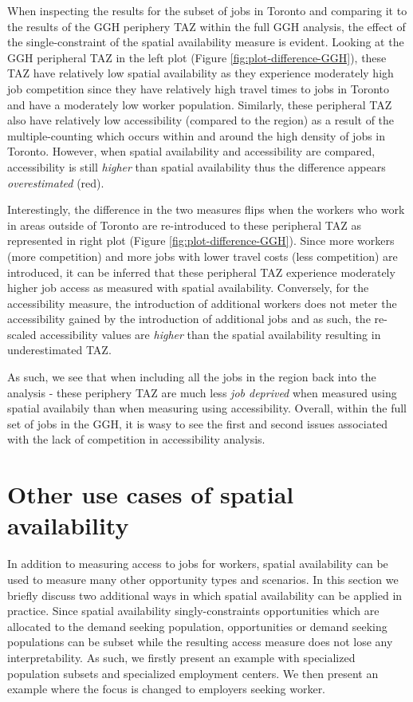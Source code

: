 \documentclass[]{elsarticle} %
\begin{document}
When inspecting the results for the subset of jobs in Toronto and
comparing it to the results of the GGH periphery TAZ within the full GGH
analysis, the effect of the single-constraint of the spatial
availability measure is evident. Looking at the GGH peripheral TAZ in
the left plot (Figure \ref{fig:plot-difference-GGH}), these TAZ have
relatively low spatial availability as they experience moderately high
job competition since they have relatively high travel times to jobs in
Toronto and have a moderately low worker population. Similarly, these
peripheral TAZ also have relatively low accessibility (compared to the
region) as a result of the multiple-counting which occurs within and
around the high density of jobs in Toronto. However, when spatial
availability and accessibility are compared, accessibility is still
\emph{higher} than spatial availability thus the difference appears
\emph{overestimated} (red).

Interestingly, the difference in the two measures flips when the workers
who work in areas outside of Toronto are re-introduced to these
peripheral TAZ as represented in right plot (Figure
\ref{fig:plot-difference-GGH}). Since more workers (more competition)
and more jobs with lower travel costs (less competition) are introduced,
it can be inferred that these peripheral TAZ experience moderately
higher job access as measured with spatial availability. Conversely, for
the accessibility measure, the introduction of additional workers does
not meter the accessibility gained by the introduction of additional
jobs and as such, the re-scaled accessibility values are \emph{higher}
than the spatial availability resulting in underestimated TAZ.

As such, we see that when including all the jobs in the region back into
the analysis - these periphery TAZ are much less \emph{job deprived}
when measured using spatial availabily than when measuring using
accessibility. Overall, within the full set of jobs in the GGH, it is
wasy to see the first and second issues associated with the lack of
competition in accessibility analysis.

\hypertarget{other-use-cases-of-spatial-availability}{%
\section{Other use cases of spatial
availability}\label{other-use-cases-of-spatial-availability}}

In addition to measuring access to jobs for workers, spatial
availability can be used to measure many other opportunity types and
scenarios. In this section we briefly discuss two additional ways in
which spatial availability can be applied in practice. Since spatial
availability singly-constraints opportunities which are allocated to the
demand seeking population, opportunities or demand seeking populations
can be subset while the resulting access measure does not lose any
interpretability. As such, we firstly present an example with
specialized population subsets and specialized employment centers. We
then present an example where the focus is changed to employers seeking
worker.
\end{document}

